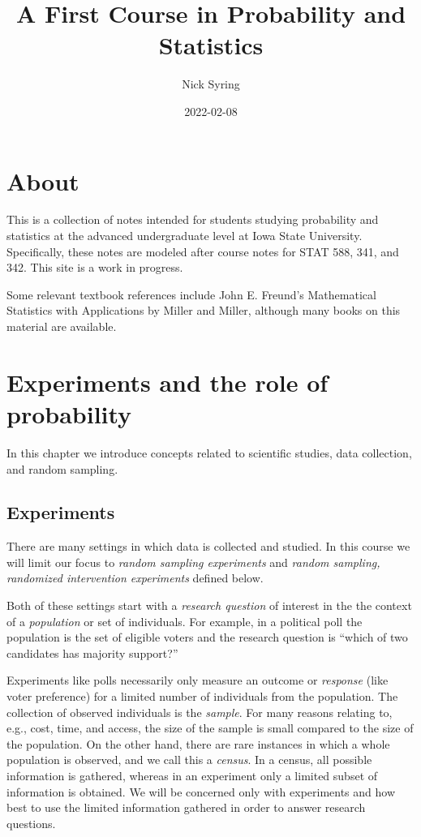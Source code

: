 \documentclass[
]{book}
\title{A First Course in Probability and Statistics}
\author{Nick Syring}
\date{2022-02-08}
\begin{document}
\maketitle

{
\setcounter{tocdepth}{1}
\tableofcontents
}
\hypertarget{about}{%
\chapter{About}\label{about}}

This is a collection of notes intended for students studying probability and statistics at the advanced undergraduate level at Iowa State University. Specifically, these notes are modeled after course notes for STAT 588, 341, and 342. This site is a work in progress.

Some relevant textbook references include John E. Freund's Mathematical Statistics with Applications by Miller and Miller, although many books on this material are available.

\hypertarget{experiments-and-the-role-of-probability}{%
\chapter{Experiments and the role of probability}\label{experiments-and-the-role-of-probability}}

In this chapter we introduce concepts related to scientific studies, data collection, and random sampling.

\hypertarget{experiments}{%
\section{Experiments}\label{experiments}}

There are many settings in which data is collected and studied. In this course we will limit our focus to \emph{random sampling experiments} and \emph{random sampling, randomized intervention experiments} defined below.

Both of these settings start with a \emph{research question} of interest in the the context of a \emph{population} or set of individuals. For example, in a political poll the population is the set of eligible voters and the research question is ``which of two candidates has majority support?''

Experiments like polls necessarily only measure an outcome or \emph{response} (like voter preference) for a limited number of individuals from the population. The collection of observed individuals is the \emph{sample}. For many reasons relating to, e.g., cost, time, and access, the size of the sample is small compared to the size of the population. On the other hand, there are rare instances in which a whole population is observed, and we call this a \emph{census}. In a census, all possible information is gathered, whereas in an experiment only a limited subset of information is obtained. We will be concerned only with experiments and how best to use the limited information gathered in order to answer research questions.
\end{document}
